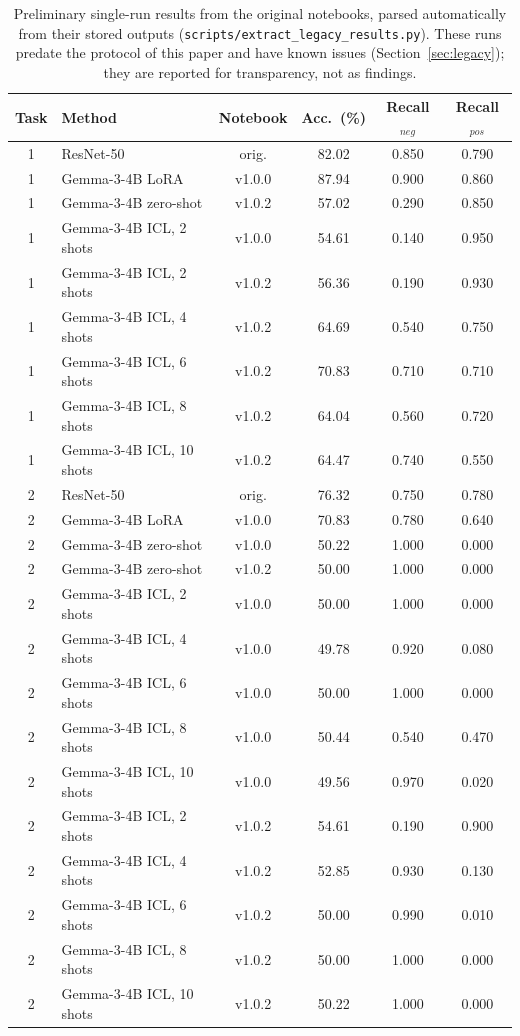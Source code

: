 \begin{table}[t]
\centering
\scriptsize
\caption{Preliminary single-run results from the original notebooks, parsed automatically from their stored outputs (\texttt{scripts/extract\_legacy\_results.py}). These runs predate the protocol of this paper and have known issues (Section~\ref{sec:legacy}); they are reported for transparency, not as findings.}
\label{tab:legacy}
\begin{tabular}{clcccc}
\toprule
Task & Method & Notebook & Acc.\ (\%) & Recall$_{neg}$ & Recall$_{pos}$\\
\midrule
1 & ResNet-50 & orig. & 82.02 & 0.850 & 0.790 \\
1 & Gemma-3-4B LoRA & v1.0.0 & 87.94 & 0.900 & 0.860 \\
1 & Gemma-3-4B zero-shot & v1.0.2 & 57.02 & 0.290 & 0.850 \\
1 & Gemma-3-4B ICL, 2 shots & v1.0.0 & 54.61 & 0.140 & 0.950 \\
1 & Gemma-3-4B ICL, 2 shots & v1.0.2 & 56.36 & 0.190 & 0.930 \\
1 & Gemma-3-4B ICL, 4 shots & v1.0.2 & 64.69 & 0.540 & 0.750 \\
1 & Gemma-3-4B ICL, 6 shots & v1.0.2 & 70.83 & 0.710 & 0.710 \\
1 & Gemma-3-4B ICL, 8 shots & v1.0.2 & 64.04 & 0.560 & 0.720 \\
1 & Gemma-3-4B ICL, 10 shots & v1.0.2 & 64.47 & 0.740 & 0.550 \\
2 & ResNet-50 & orig. & 76.32 & 0.750 & 0.780 \\
2 & Gemma-3-4B LoRA & v1.0.0 & 70.83 & 0.780 & 0.640 \\
2 & Gemma-3-4B zero-shot & v1.0.0 & 50.22 & 1.000 & 0.000 \\
2 & Gemma-3-4B zero-shot & v1.0.2 & 50.00 & 1.000 & 0.000 \\
2 & Gemma-3-4B ICL, 2 shots & v1.0.0 & 50.00 & 1.000 & 0.000 \\
2 & Gemma-3-4B ICL, 4 shots & v1.0.0 & 49.78 & 0.920 & 0.080 \\
2 & Gemma-3-4B ICL, 6 shots & v1.0.0 & 50.00 & 1.000 & 0.000 \\
2 & Gemma-3-4B ICL, 8 shots & v1.0.0 & 50.44 & 0.540 & 0.470 \\
2 & Gemma-3-4B ICL, 10 shots & v1.0.0 & 49.56 & 0.970 & 0.020 \\
2 & Gemma-3-4B ICL, 2 shots & v1.0.2 & 54.61 & 0.190 & 0.900 \\
2 & Gemma-3-4B ICL, 4 shots & v1.0.2 & 52.85 & 0.930 & 0.130 \\
2 & Gemma-3-4B ICL, 6 shots & v1.0.2 & 50.00 & 0.990 & 0.010 \\
2 & Gemma-3-4B ICL, 8 shots & v1.0.2 & 50.00 & 1.000 & 0.000 \\
2 & Gemma-3-4B ICL, 10 shots & v1.0.2 & 50.22 & 1.000 & 0.000 \\
\bottomrule
\end{tabular}
\end{table}
